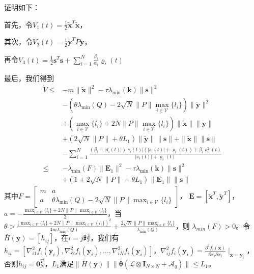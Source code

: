 \documentclass[12pt, a4paper, oneside]{ctexbook}
\begin{document}
证明如下：

首先，令$V_1(t) = \frac{1}{2}\tilde{\mathbf{x}}^{T}\tilde{\mathbf{x}}$，

其次，令$V_2(t) = \frac{1}{2}\tilde{\mathbf{y}}^{T}P\tilde{\mathbf{y}}$，

再令$V_3(t) = \frac{1}{2}\mathbf{s}^{T}\mathbf{s} + \sum_{i = 1}^{N} \frac{\beta_i}{\alpha_i}\varrho_i(t)$


最后，我们得到
$$
    \begin{aligned}
        \dot{V}\leq & -m\|\tilde{\mathbf{x}}\|^2-\tau\lambda_{\min}(\mathbf{k})\|\mathbf{s}\|^2                                                    \\
                    & -(\theta\lambda_{\min}(Q)-2\sqrt{N}\|P\|\max_{i\in\mathcal{V}}\{l_i\})\|\tilde{\mathbf{y}}\|^2                               \\
                    & +(\max_{i\in\mathcal{V}}\{l_i\}+2N\|P\|\max_{i\in\mathcal{V}}\{l_i\})\|\tilde{\mathbf{x}}\|\|\tilde{\mathbf{y}}\|            \\
                    & +(2\sqrt{N}\|P\|+\theta L_{1})\|\tilde{\mathbf{y}}\|\|\mathbf{s}\|+\|\tilde{\mathbf{x}}\|\|\mathbf{s}\|                      \\
                    & -\sum_{i = 1}^{N}\frac{(\beta_i - |d_i(t)|)|s_i(t)|(|s_i(t)|+\varrho_i(t)) + \beta_i\varrho_i^2(t)}{|s_i(t)| + \varrho_i(t)} \\
        \leq        & -\lambda_{\min}(F)\|\mathbf{E}_1\|^2-\tau\lambda_{\min}(\mathbf{k})\|\mathbf{s}\|^2                                          \\
                    & +(1+2\sqrt{N}\|P\|+\theta L_1)\|\mathbf{E}_1\|\|\mathbf{s}\|
    \end{aligned}
$$
其中$\left.F=\left[\begin{array}{cc}m & a                                                                   \\
             a     & \theta\lambda_{\min}(Q)-2\sqrt{N}\|P\|\max_{i\in\mathcal{V}}\{l_i\}\end{array}\right.\right]$，
$\mathbf{E} = [\tilde{\mathbf{x}}^T,\tilde{\mathbf{y}}^T]$，
~~~~~$a = -\frac{\max_{i\in\mathcal{V}}\{l_{i}\}+2N\|P\|\max_{i\in\mathcal{V}}\{l_{i}\}}{2}$，当
$\theta > \frac{(\max_{i\in\mathcal{V}}\{l_{i}\}+2N\|P\|\max_{i\in\mathcal{V}}(l_{i}\})^{2}}{4m\lambda_{\mathrm{min}}(Q)}+\frac{2\sqrt{N}\|P\|\max_{i\in\mathcal{V}}\{l_{i}\}}{\lambda_{\mathrm{min}}(Q)}$，则
$\lambda_{min}(F) > 0$。令$\bar{H}(\mathbf{y})=[h_{ij}]$，在$i = j$时，我们有$h_{ii}=[\nabla_{i1}^{2}f_{i}(\mathbf{y}_{i}),\nabla_{i2}^{2}f_{i}(\mathbf{y}_{i}),\ldots,\nabla_{iN}^{2}f_{i}(\mathbf{y}_{i})]$，$\nabla_{ij}^{2}f_{i}(\mathbf{y}_{i})=\frac{\partial^{2}f_{i}(\mathbf{x})}{\partial x_{i}\partial x_{i}}\mid_{\mathbf{x}=\mathbf{y}_{i}}$，否则$h_{ij} = \mathbf{0}_N^T$，$L_1$满足$\|\bar{H}(\mathbf{y})\|\|\bar{\boldsymbol{\theta}}(\mathcal{L}\otimes \mathbf{I}_{N\times N}+\mathcal{A}_{q})\|\leq L_{1}$。
\end{document}

